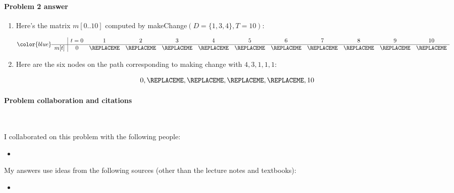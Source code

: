 \paragraph{Problem 2 answer}

\begin{enumerate}

\item[(a)]

Here's the matrix $m[0..10]$ computed by \textsf{makeChange}$(D=\{1,3,4\}, T=10)$:

\[\color{blue}
  \begin{array}{c|ccccccccccc}
         &  t=0  &  1  & 2  &   3   &   4   &  5 & 6 & 7 & 8 & 9 & 10 \\ \hline
    m[t]
         & 0 %
         & \REPLACEME %
         & \REPLACEME %
         & \REPLACEME %
         & \REPLACEME %
         & \REPLACEME %
         & \REPLACEME %
         & \REPLACEME %
         & \REPLACEME %
         & \REPLACEME %
         & \REPLACEME %
  \end{array}
\]

\item[(b)]  Here are the six nodes on the path corresponding to making change with $4,3,1,1,1$:
  \begin{blue}
    \[
      0, \REPLACEME, \REPLACEME, \REPLACEME, \REPLACEME, 10
    \]
  \end{blue}
  
\end{enumerate}

\vfill

\paragraph{Problem  collaboration and citations}~

I collaborated on this problem with the following people:
\begin{blue}
  \begin{itemize}
  \item \REPLACEME                    %
  \end{itemize}
\end{blue}

My answers use ideas from the following sources (other than the lecture notes and textbooks): 
\begin{blue}
  \begin{itemize}
  \item \REPLACEME                    %
  \end{itemize}
\end{blue}




